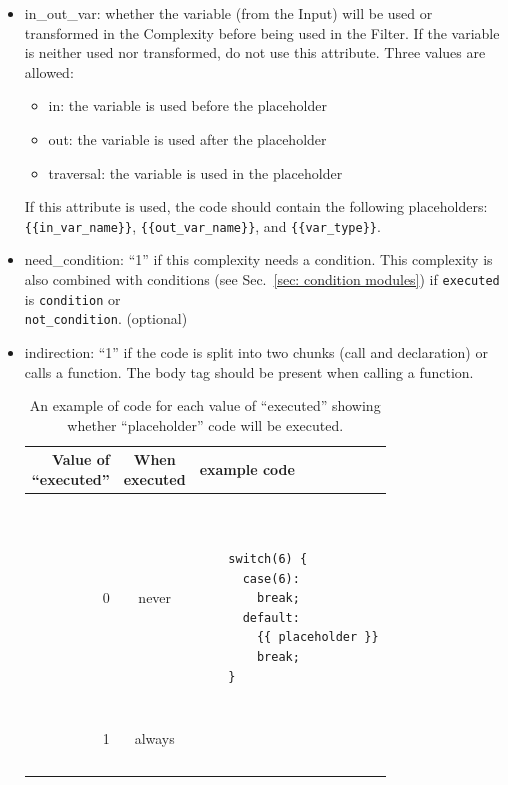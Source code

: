 \documentclass[12pt]{article}
\begin{document}
\begin{itemize}
    \item in\_out\_var: whether the variable (from the Input) will be used or
    transformed in the Complexity before being used in the Filter.  If the
    variable is neither used nor transformed, do not use this attribute.
    Three values are allowed:
    \begin{itemize}[nosep]
        \item in: the variable is used before the placeholder
        \item out: the variable is used after the placeholder
        \item traversal: the variable is used in the placeholder
    \end{itemize}
    If this attribute is used, the code should contain the following
    placeholders: \\
    \verb|{{in_var_name}}|, \verb|{{out_var_name}}|, and \verb|{{var_type}}|.

    \item need\_condition: ``1'' if this complexity needs a condition.
      This complexity is also combined with conditions (see
      Sec.~\ref{sec: condition modules}) if \verb|executed| is \verb|condition|
      or \\ \verb|not_condition|. (optional)

    \item indirection: ``1'' if the code is split into two chunks (call and
    declaration) or calls a function.  The body tag should be present when
    calling a function.

    \begin{table}[H]
    \centering
    \caption{An example of code for each value of ``executed'' showing whether
      ``placeholder'' code will be executed.}
    \begin{tabular}{|r|c|l|}
    \hline
      \makecell{Value of \\ ``executed''} &
      \makecell{When \\ executed} &
      example code \\
    \hline
    0 &
    never &
    \begin{minipage}{3in}
    \begin{verbatim}


    switch(6) {
      case(6):
        break;
      default:
        {{ placeholder }}
        break;
    }
    \end{verbatim}
    \end{minipage}
    \\
    \hline
    1 &
    always &
    \begin{minipage}{3in}
    \begin{verbatim}



\end{verbatim}
\end{minipage}
\end{tabular}
\end{table}
\end{itemize}
\end{document}
